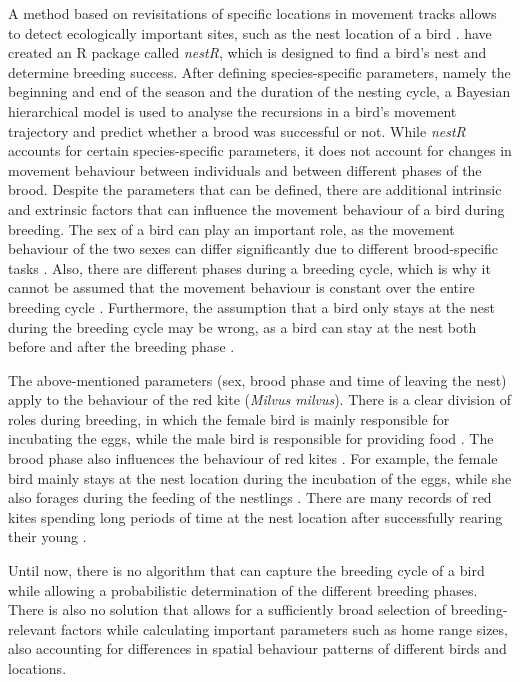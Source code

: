 A method based on revisitations of specific locations in movement tracks allows to detect ecologically important sites, such as the nest location of a bird \parencite[, R package \textit{recurse}]{bracis2018revisit}. \textcite{picardi2020analysis} have created an R package called \textit{nestR}, which is designed to find a bird's nest and determine breeding success. After defining species-specific parameters, namely the beginning and end of the season and the duration of the nesting cycle, a Bayesian hierarchical model is used to analyse the recursions in a bird's movement trajectory and predict whether a brood was successful or not. While \textit{nestR} accounts for certain species-specific parameters, it does not account for changes in movement behaviour between individuals and between different phases of the brood. Despite the parameters that can be defined, there are additional intrinsic and extrinsic factors that can influence the movement behaviour of a bird during breeding. The sex of a bird can play an important role, as the movement behaviour of the two sexes can differ significantly due to different brood-specific tasks \parencite{spatz2021zwischen, spatz2022sex}. Also, there are different phases during a breeding cycle, which is why it cannot be assumed that the movement behaviour is constant over the entire breeding cycle \parencite{spatz2019raumnutzung}. Furthermore, the assumption that a bird only stays at the nest during the breeding cycle may be wrong, as a bird can stay at the nest both before and after the breeding phase \parencite{aebischer2021rotmilan}.

The above-mentioned parameters (sex, brood phase and time of leaving the nest) apply to the behaviour of the red kite (\textit{Milvus milvus}). There is a clear division of roles during breeding, in which the female bird is mainly responsible for incubating the eggs, while the male bird is responsible for providing food \parencite{spatz2021zwischen, spatz2022sex}. The brood phase also influences the behaviour of red kites \parencite{spatz2019raumnutzung}. For example, the female bird mainly stays at the nest location during the incubation of the eggs, while she also forages during the feeding of the nestlings \parencite{aebischer2021rotmilan, spatz2021zwischen}. There are many records of red kites spending long periods of time at the nest location after successfully rearing their young \parencite{paquet2015premiers, spatz2021zwischen}. 

Until now, there is no algorithm that can capture the breeding cycle of a bird while allowing a probabilistic determination of the different breeding phases. There is also no solution that allows for a sufficiently broad selection of breeding-relevant factors while calculating important parameters such as home range sizes, also accounting for differences in spatial behaviour patterns of different birds and locations.

